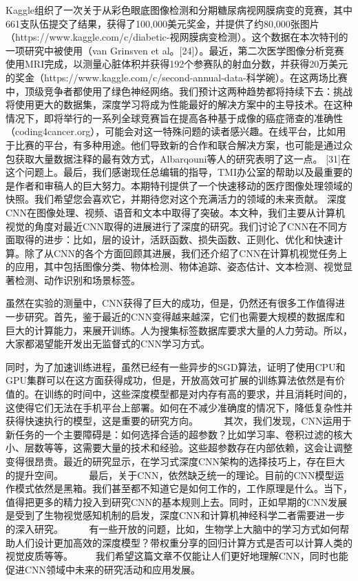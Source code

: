 Kaggle组织了一次关于从彩色眼底图像检测和分期糖尿病视网膜病变的竞赛，其中661支队伍提交了结果，获得了100,000美元奖金，并提供了约80,000张图片（https://www.kaggle.com/c/diabetic-视网膜病变检测）。这个数据在本次特刊的一项研究中被使用（van Grinsven et al。[24]）。最近，第二次医学图像分析竞赛使用MRI完成，以测量心脏体积并获得192个参赛队的射血分数，并获得20万美元的奖金（https://www.kaggle.com/c/second-annual-data-科学碗）。在这两场比赛中，顶级竞争者都使用了绿色神经网络。我们预计这两种趋势都将持续下去：挑战将使用更大的数据集，深度学习将成为性能最好的解决方案中的主导技术。在这种情况下，即将举行的一系列全球竞赛旨在提高各种基于成像的癌症筛查的准确性（coding4cancer.org），可能会对这一特殊问题的读者感兴趣。在线平台，比如用于比赛的平台，有多种用途。他们导致新的合作和联合解决方案，也可能是通过众包获取大量数据注释的最有效方式，Albarqouni等人的研究表明了这一点。 [31]在这个问题上。最后，我们感谢现任总编辑的指导，TMI办公室的帮助以及最重要的是作者和审稿人的巨大努力。本期特刊提供了一个快速移动的医疗图像处理领域的快照。我们希望您会喜欢它，并期待您对这个充满活力的领域的未来贡献。
深度CNN在图像处理、视频、语音和文本中取得了突破。本文种，我们主要从计算机视觉的角度对最近CNN取得的进展进行了深度的研究。我们讨论了CNN在不同方面取得的进步：比如，层的设计，活跃函数、损失函数、正则化、优化和快速计算。除了从CNN的各个方面回顾其进展，我们还介绍了CNN在计算机视觉任务上的应用，其中包括图像分类、物体检测、物体追踪、姿态估计、文本检测、视觉显著检测、动作识别和场景标签。

虽然在实验的测量中，CNN获得了巨大的成功，但是，仍然还有很多工作值得进一步研究。首先，鉴于最近的CNN变得越来越深，它们也需要大规模的数据库和巨大的计算能力，来展开训练。人为搜集标签数据库要求大量的人力劳动。所以，大家都渴望能开发出无监督式的CNN学习方式。

同时，为了加速训练进程，虽然已经有一些异步的SGD算法，证明了使用CPU和GPU集群可以在这方面获得成功，但是，开放高效可扩展的训练算法依然是有价值的。在训练的时间中，这些深度模型都是对内存有高的要求，并且消耗时间的，这使得它们无法在手机平台上部署。如何在不减少准确度的情况下，降低复杂性并获得快速执行的模型，这是重要的研究方向。
　　
其次，我们发现，CNN运用于新任务的一个主要障碍是：如何选择合适的超参数？比如学习率、卷积过滤的核大小、层数等等，这需要大量的技术和经验。这些超参数存在内部依赖，这会让调整变得很昂贵。最近的研究显示，在学习式深度CNN架构的选择技巧上，存在巨大的提升空间。
　　
最后，关于CNN，依然缺乏统一的理论。目前的CNN模型运作模式依然是黑箱。我们甚至都不知道它是如何工作的，工作原理是什么。当下，值得把更多的精力投入到研究CNN的基本规则上去。同时，正如早期的CNN发展是受到了生物视觉感知机制的启发，深度CNN和计算机神经科学二者需要进一步的深入研究。
　　
有一些开放的问题，比如，生物学上大脑中的学习方式如何帮助人们设计更加高效的深度模型？带权重分享的回归计算方式是否可以计算人类的视觉皮质等等。
　　我们希望这篇文章不仅能让人们更好地理解CNN，同时也能促进CNN领域中未来的研究活动和应用发展。